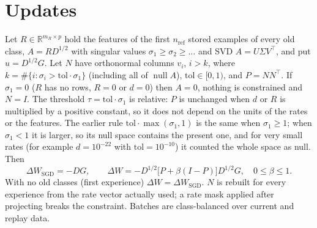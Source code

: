 \documentclass[11pt,a4paper]{article}
\theoremstyle{remark}\newtheorem*{rem}{Remark}
\newcommand{\R}{\mathbb{R}}
\DeclareMathOperator{\nul}{null}
\begin{document}
\section{Updates}
Let $R\in\R^{m_R\times p}$ hold the features of the first $n_{\text{ref}}$ stored examples of every old
class, $A=RD^{1/2}$ with singular values $\sigma_1\ge\sigma_2\ge\dots$ and SVD $A=U\Sigma V^\top$, and put
$u=D^{1/2}G$. Let $N$ have orthonormal columns $v_i$, $i>k$, where $k=\#\{i:\sigma_i>\mathrm{tol}\cdot\sigma_1\}$
(including all of $\nul A$), $\mathrm{tol}\in[0,1)$, and $P=NN^\top$. If $\sigma_1=0$ ($R$ has no rows, $R=0$ or
$d=0$) then $A=0$, nothing is constrained and $N=I$. The threshold $\tau=\mathrm{tol}\cdot\sigma_1$ is relative: $P$ is
unchanged when $d$ or $R$ is multiplied by a positive constant, so it does not depend on the units of the rates
or the features. The earlier rule $\mathrm{tol}\cdot\max(\sigma_1,1)$ is the same when $\sigma_1\ge1$; when
$\sigma_1<1$ it is larger, so its null space contains the present one, and for very small rates (for example
$d=10^{-22}$ with $\mathrm{tol}=10^{-10}$) it counted the whole space as null. Then
\[
\Delta W_{\text{SGD}}=-DG,\qquad
\boxed{\Delta W=-D^{1/2}\big[P+\beta(I-P)\big]D^{1/2}G,\quad 0\le\beta\le1.}
\]
With no old classes (first experience) $\Delta W=\Delta W_{\text{SGD}}$. $N$ is rebuilt for every
experience from the rate vector actually used; a rate mask applied after projecting breaks the
constraint. Batches are class-balanced over current and replay data.
\end{document}
